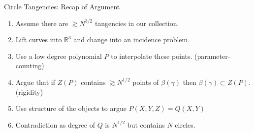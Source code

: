 \documentclass{beamer}
\newcommand{\RR}{\mathbb R}
\newcommand{\nfr}[1]{\begin{frame} #1
\end{frame}}
\begin{document}
\nfr{{Circle Tangencies: Recap of Argument}
\begin{enumerate}
    \item Assume there are $\gtrsim N^{3/2}$ tangencies in our collection.
    \item Lift curves into $\RR^3$ and change into an incidence problem.
    \item Use a low degree polynomial $P$ to interpolate these points. (parameter-counting)
    \item Argue that if $Z(P)$ contains $\gtrsim N^{1/2}$ points of $\beta(\gamma)$ then $\beta(\gamma) \subset Z(P)$. (rigidity)
    \item Use structure of the objects to argue $P(X,Y,Z) = Q(X,Y)$
    \item Contradiction as degree of $Q$ is $N^{1/2}$ but contains $N$ circles.
\end{enumerate}
}



\end{document}
